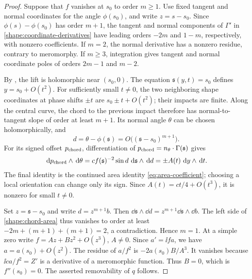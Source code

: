 \begin{proof}
Suppose that \(f\) vanishes at \(s_0\) to order \(m\geq1\). Use
fixed tangent and normal coordinates for the angle \(\phi(s_0)\),
and write \(z=s-s_0\). Since
\(\phi(s)-\phi(s_0)\) has order \(m+1\), the tangent and normal
components of \(\Gamma'\) in
\eqref{shape:coordinate-derivatives} have leading orders
\(-2m\) and \(1-m\), respectively, with nonzero coefficients.
If \(m=2\), the normal derivative has a nonzero residue, contrary
to meromorphy. If \(m\geq3\), integration gives tangent and normal
coordinate poles of orders \(2m-1\) and \(m-2\).

By , the lift is holomorphic near \((s_0,0)\).
The equation \(\mathfrak s(y,t)=s_0\) defines
\(y=s_0+O(t^2)\). For sufficiently small \(t\ne0\), the two
neighboring shape coordinates at phase shifts \(\pm t\) are
\(s_0\pm t+O(t^2)\); their impacts are finite. Along the central
curve, the chord to the previous impact therefore has normal-to-tangent
slope of order at least \(m+1\). Its normal angle \(\theta\)
can be chosen holomorphically, and
\[
 d=\theta-\phi(\mathfrak s)
   =O\big((\mathfrak s-s_0)^{m+1}\big).
\]
For its signed offset \(p_{\rm chord}\), differentiation of
\(p_{\rm chord}=n_\theta\cdot\Gamma(\mathfrak s)\) gives
\begin{equation}
 \,\mathrm d p_{\rm chord}\wedge\,\mathrm d\theta
 =c f(\mathfrak s)^{-2}\sin d\,
       \,\mathrm d\mathfrak s\wedge\,\mathrm d d
 =\pm A(t)\,\,\mathrm d y\wedge\,\mathrm d t.
 \label{shape:chord-area}
\end{equation}
The final identity is the continued area identity
\eqref{eq:area-coefficient}; choosing a local orientation can change
only its sign. Since \(A(t)=ct/4+O(t^3)\), it is nonzero for small
\(t\ne0\).

Set \(z=\mathfrak s-s_0\) and write \(d=z^{m+1}b\).
Then \(\dd\mathfrak s\wedge\dd d
=z^{m+1}\dd\mathfrak s\wedge\dd b\). The left side of
\eqref{shape:chord-area} thus vanishes to order at least
\(-2m+(m+1)+(m+1)=2\), a contradiction. Hence \(m=1\).
At a simple zero write \(f=Az+Bz^2+O(z^3)\), \(A\ne0\).
Since \(a'=\ii fa\), we have \(a=a(s_0)+O(z^2)\). The residue
of \(a/f^2\) is \(-2a(s_0)B/A^3\). It vanishes because
\(\ii c a/f^2=Z'\) is a derivative of a meromorphic function.
Thus \(B=0\), which is \(f''(s_0)=0\). The asserted removability
of \(q\) follows.
\end{proof}

